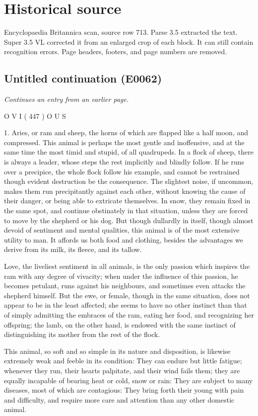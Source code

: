 \documentclass{article}
\begin{document}
\section*{Historical source}
Encyclopaedia Britannica scan, source row 713. Parse 3.5 extracted the text. Super 3.5 VL corrected it from an enlarged crop of each block. It can still contain recognition errors.
Page headers, footers, and page numbers are removed.

\subsection*{Untitled continuation (E0062)}
\textit{Continues an entry from an earlier page.}

O V I ( 447 ) O U S

1. Aries, or ram and sheep, the horns of which are flapped like a half moon, and compressed. This animal is perhaps the most gentle and inoffensive, and at the same time the most timid and stupid, of all quadrupeds. In a flock of sheep, there is always a leader, whose steps the rest implicitly and blindly follow. If he runs over a precipice, the whole flock follow his example, and cannot be restrained though evident destruction be the consequence. The slightest noise, if uncommon, makes them run precipitantly against each other, without knowing the cause of their danger, or being able to extricate themselves. In snow, they remain fixed in the same spot, and continue obstinately in that situation, unless they are forced to move by the shepherd or his dog. But though dullardly in itself, though almost devoid of sentiment and mental qualities, this animal is of the most extensive utility to man. It affords us both food and clothing, besides the advantages we derive from its milk, its fleece, and its tallow.

Love, the liveliest sentiment in all animals, is the only passion which inspires the ram with any degree of vivacity; when under the influence of this passion, he becomes petulant, runs against his neighbours, and sometimes even attacks the shepherd himself. But the ewe, or female, though in the same situation, does not appear to be in the least affected; she seems to have no other instinct than that of simply admitting the embraces of the ram, eating her food, and recognizing her offspring; the lamb, on the other hand, is endowed with the same instinct of distinguishing its mother from the rest of the flock.

This animal, so soft and so simple in its nature and disposition, is likewise extremely weak and feeble in its condition: They can endure but little fatigue; whenever they run, their hearts palpitate, and their wind fails them; they are equally incapable of bearing heat or cold, snow or rain: They are subject to many diseases, most of which are contagious: They bring forth their young with pain and difficulty, and require more care and attention than any other domestic animal.
\end{document}
